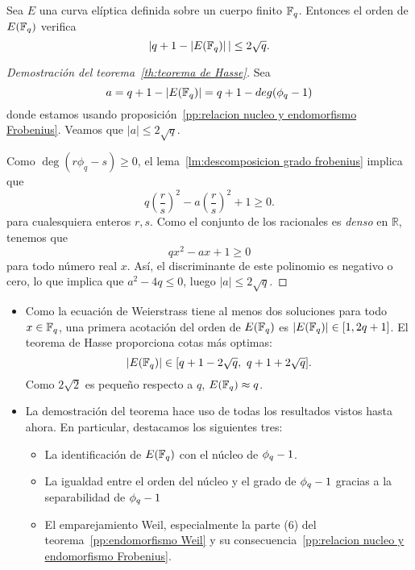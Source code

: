 \begin{teorema2}[\ref{th:teorema de Hasse}]
	Sea $E$ una curva elíptica definida sobre un cuerpo finito $\mathbb{F}_q$. Entonces el orden de $E(\mathbb{F}_q)$ verifica
	$$
		|q + 1 - \left\vert{E(\mathbb{F}_{q})}\right\vert| \le 2 \sqrt{q}.
	$$
\end{teorema2}
\begin{proof}[Demostración del teorema~\ref{th:teorema de Hasse}]
Sea
$$
	a = q + 1 - \left\vert{E(\mathbb{F}_{q})}\right\vert = q + 1 - deg(\phi_q - 1)
$$
donde estamos usando proposición~\ref{pp:relacion nucleo y endomorfismo Frobenius}. Veamos que $|a| \le 2 \sqrt{q}$.

Como $\deg(r \phi_q - s) \ge 0$, el lema~\ref{lm:descomposicion grado frobenius} implica que
$$
q \left( \frac{r}{s} \right)^2 - a \left(\frac{r}{s} \right) ^2 + 1 \ge 0.
$$
para cualesquiera enteros $r, s$. Como el conjunto de los racionales es \emph{denso} en $\mathbb{R}$, tenemos que
$$
q x^2 - a x + 1 \ge 0
$$
para todo número real $x$. Así, el discriminante de este polinomio es negativo o cero, lo que implica que $a^2 - 4 q \le 0$, luego $| a | \le 2 \sqrt{q}$.
\end{proof}

\begin{nota}\leavevmode
	\begin{itemize}
		\item Como la ecuación de Weierstrass tiene al menos dos soluciones para todo $x \in \mathbb{F}_q$, una primera acotación del orden de $E(\mathbb{F}_q)$ es  $\left\vert{E(\mathbb{F}_{q})}\right\vert \in [1, 2 q + 1]$. El teorema de Hasse proporciona cotas más optimas:
		$$
		\left\vert{E(\mathbb{F}_{q})}\right\vert \in [q + 1 - 2 \sqrt{q}, \ q + 1 + 2 \sqrt{q}].
		$$
		Como $2\sqrt{2}$ es pequeño respecto a $q$, $E(\mathbb{F}_q) \approx q$.
		\item La demostración del teorema hace uso de todas los resultados vistos hasta ahora. En particular, destacamos los siguientes tres:
			\begin{itemize}
				\item La identificación de $E(\mathbb{F}_q)$ con el núcleo de $\phi_q - 1$.
				\item La igualdad entre el orden del núcleo y el grado de $\phi_q - 1$ gracias a la separabilidad de $\phi_q - 1$
				\item El emparejamiento Weil, especialmente la parte (6) del teorema~\ref{pp:endomorfismo Weil} y su consecuencia~\ref{pp:relacion nucleo y endomorfismo Frobenius}.
			\end{itemize}
	\end{itemize}
\end{nota}

